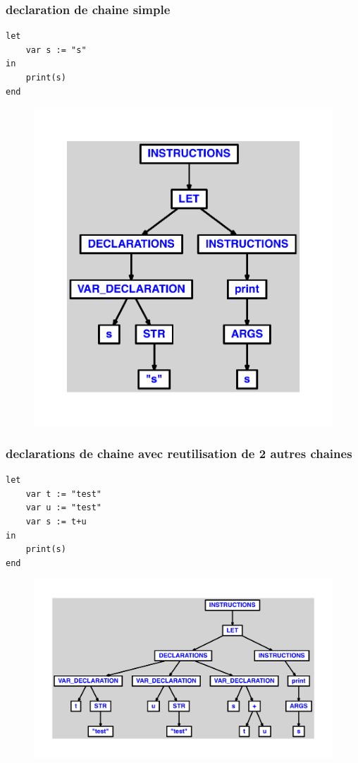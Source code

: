 \documentclass{article}
\begin{document}
\subsubsection{declaration de chaine simple}
\begin{lstlisting}
let
	var s := "s"
in
	print(s)
end
\end{lstlisting}
\newpage
\begin{figure}[H]
\centering
\includegraphics[max width=\textwidth]{ast/ast_309.pdf}
\end{figure}
\newpage
\subsubsection{declarations de chaine avec reutilisation de 2 autres chaines}
\begin{lstlisting}
let
	var t := "test"
	var u := "test"
	var s := t+u
in
	print(s)
end
\end{lstlisting}
\newpage
\begin{figure}[H]
\centering
\includegraphics[max width=\textwidth]{ast/ast_310.pdf}
\end{figure}
\newpage
\end{document}
